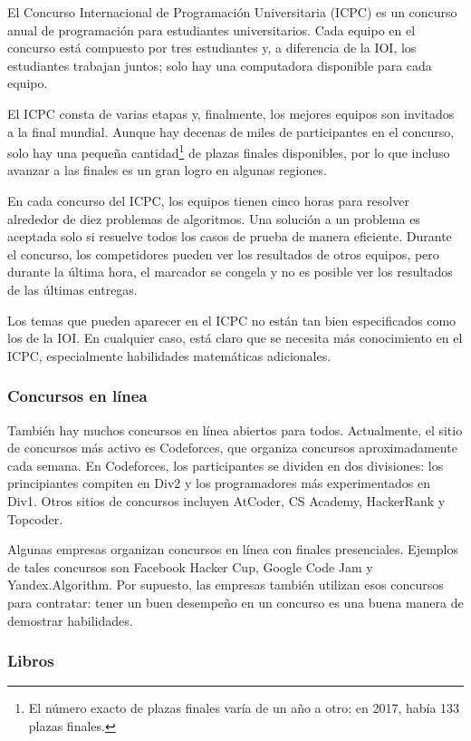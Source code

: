El Concurso Internacional de Programación Universitaria (ICPC)
es un concurso anual de programación para estudiantes universitarios.
Cada equipo en el concurso está compuesto por tres estudiantes
y, a diferencia de la IOI, los estudiantes trabajan juntos;
solo hay una computadora disponible para cada equipo.

El ICPC consta de varias etapas y, finalmente, los
mejores equipos son invitados a la final mundial.
Aunque hay decenas de miles de participantes
en el concurso, solo hay una pequeña cantidad\footnote{El número exacto de plazas finales varía
    de un año a otro; en 2017, había 133 plazas finales.} de plazas finales disponibles,
por lo que incluso avanzar a las finales
es un gran logro en algunas regiones.

En cada concurso del ICPC, los equipos tienen cinco horas para
resolver alrededor de diez problemas de algoritmos.
Una solución a un problema es aceptada solo si resuelve
todos los casos de prueba de manera eficiente.
Durante el concurso, los competidores pueden ver los resultados de otros equipos,
pero durante la última hora, el marcador se congela y no
es posible ver los resultados de las últimas entregas.

Los temas que pueden aparecer en el ICPC no están tan bien
especificados como los de la IOI.
En cualquier caso, está claro que se necesita más conocimiento
en el ICPC, especialmente habilidades matemáticas adicionales.

\subsubsection{Concursos en línea}

También hay muchos concursos en línea abiertos para todos.
Actualmente, el sitio de concursos más activo es Codeforces,
que organiza concursos aproximadamente cada semana.
En Codeforces, los participantes se dividen en dos divisiones:
los principiantes compiten en Div2 y los programadores más experimentados en Div1.
Otros sitios de concursos incluyen AtCoder, CS Academy, HackerRank y Topcoder.

Algunas empresas organizan concursos en línea con finales presenciales.
Ejemplos de tales concursos son Facebook Hacker Cup,
Google Code Jam y Yandex.Algorithm.
Por supuesto, las empresas también utilizan esos concursos para contratar:
tener un buen desempeño en un concurso es una buena manera de demostrar habilidades.

\subsubsection{Libros}

